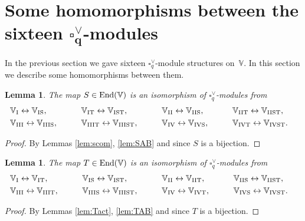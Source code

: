 \documentclass[pdftex]{sigma}
\numberwithin{equation}{section}
\newtheorem{Lemma}[Theorem]{Lemma}
\begin{document}
\section[Some homomorphisms between the sixteen $\square^\vee_q$-modules]{Some homomorphisms between the sixteen $\boldsymbol{\square^\vee_q}$-modules}\label{section12}

In the previous section we gave sixteen $\square^\vee_q$-module structures on~$\mathbb V$. In this section
we describe some homomorphisms between them.

\begin{Lemma}\label{lem:SIso}The map $S \in {\rm End}(\mathbb V)$ is an isomorphism of
 $\square^\vee_q$-modules from
\begin{alignat*}{5}
&
\mathbb V_{\rm I} \leftrightarrow \mathbb V_{\rm IS}, \qquad &&
\mathbb V_{\rm IT} \leftrightarrow \mathbb V_{\rm IST}, \qquad &&
\mathbb V_{\rm II} \leftrightarrow \mathbb V_{\rm IIS}, \qquad &&
\mathbb V_{\rm IIT} \leftrightarrow \mathbb V_{\rm IIST}, &
\\
&\mathbb V_{\rm III} \leftrightarrow \mathbb V_{\rm IIIS}, \qquad &&
\mathbb V_{\rm IIIT} \leftrightarrow \mathbb V_{\rm IIIST}, \qquad &&
\mathbb V_{\rm IV} \leftrightarrow \mathbb V_{\rm IVS}, \qquad &&
\mathbb V_{\rm IVT} \leftrightarrow \mathbb V_{\rm IVST}.&
\end{alignat*}
\end{Lemma}
\begin{proof} By Lemmas \ref{lem:scom}, \ref{lem:SAB} and since $S$ is a bijection.
\end{proof}

\begin{Lemma}\label{lem:TIso}The map $T \in {\rm End}(\mathbb V)$ is an isomorphism of $\square^\vee_q$-modules from
\begin{alignat*}{5}
&
\mathbb V_{\rm I} \leftrightarrow \mathbb V_{\rm IT}, \qquad &&
\mathbb V_{\rm IS} \leftrightarrow\mathbb V_{\rm IST}, \qquad &&
\mathbb V_{\rm II} \leftrightarrow \mathbb V_{\rm IIT}, \qquad &&
\mathbb V_{\rm IIS} \leftrightarrow \mathbb V_{\rm IIST},&
\\
&\mathbb V_{\rm III} \leftrightarrow \mathbb V_{\rm IIIT}, \qquad &&
\mathbb V_{\rm IIIS} \leftrightarrow \mathbb V_{\rm IIIST}, \qquad &&
\mathbb V_{\rm IV} \leftrightarrow \mathbb V_{\rm IVT}, \qquad &&
\mathbb V_{\rm IVS} \leftrightarrow \mathbb V_{\rm IVST}.&
\end{alignat*}
\end{Lemma}
\begin{proof} By Lemmas \ref{lem:Tact}, \ref{lem:TAB} and since $T$ is a bijection.
\end{proof}
\end{document}
